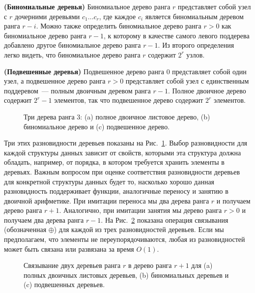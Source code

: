 \begin{definition}
  \textbf{(Биномиальные деревья)} Биномиальное дерево ранга $r$
  представляет собой узел с $r$ дочерними деревьями $c_1 \ldots c_r$,
  где каждое $c_i$ является биномиальным деревом ранга $r -
  i$. Можно также определить биномиальное дерево ранга $r > 0$ как
  биномиальное дерево ранга $r - 1$, к которому в качестве самого
  левого поддерева добавлено другое биномиальное дерево ранга $r -
  1$. Из второго определения легко видеть, что биномиальное дерево
  ранга $r$ содержит $2^r$ узлов.
\end{definition}

\begin{definition}
  \textbf{(Подвешенные деревья)} Подвешенное дерево ранга 0 представляет собой один узел, а
  подвешенное дерево ранга $r > 0$ представляет собой узел с единственным
  поддеревом~--- полным двоичным деревом ранга $r - 1$. Полное
  двоичное дерево содержит $2^r - 1$ элементов, так что подвешенное дерево
  содержит $2^r$ элементов.
\end{definition}

\begin{figure}
  \centering
  
  \caption{Три дерева ранга 3: (a) полное двоичное листовое дерево,
    (b) биномиальное дерево и (c) подвешенное дерево.}
  \label{fig:9.2}
\end{figure}

Три этих разновидности деревьев показаны на
Рис.~\ref{fig:9.2}. Выбор разновидности для каждой структуры данных
зависит от свойств, которыми эта структура должна обладать, например,
от порядка, в котором требуется хранить элементы в деревьях. Важным
вопросом при оценке соответствия разновидности деревьев для конкретной
структуры данных будет то, насколько хорошо данная разновидность
поддерживает функции, аналогичные переносу и занятию в двоичной
арифметике. При имитации переноса мы  два дерева
ранга $r$ и получаем дерево ранга $r+1$. Аналогично, при имитации
занятия мы  дерево ранга $r > 0$ и получаем
два дерева ранга $r-1$. На Рис.~\ref{fig:9.3} показана операция
связывания (обозначенная $\oplus$) 
для каждой из трех разновидностей деревьев. Если мы предполагаем, что
элементы не переупорядочиваются, любая из разновидностей может быть
связана или развязана за время $O(1)$.

\begin{figure}
  \centering
  
  \caption{Связывание двух деревьев ранга $r$ в дерево ранга $r+1$ для
    (a) полных двоичных листовых деревьев, (b) биномиальных деревьев и
    (c) подвешенных деревьев.}
  \label{fig:9.3}
\end{figure}

